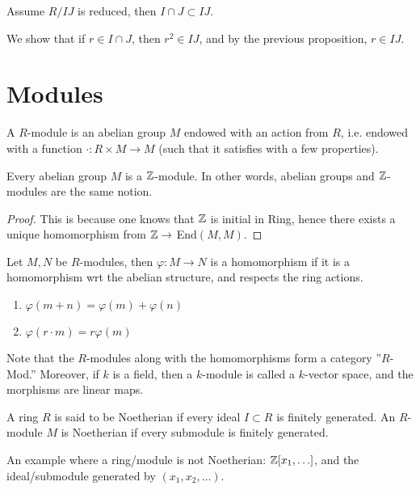 \begin{example}
    Assume $R/IJ$ is reduced, then $I\cap J\subset IJ$. 

    We show that if $r\in I\cap J$, then $r^2\in IJ$, and by the previous proposition, $r\in IJ$.
\end{example}

\section{Modules}
\begin{defn}[$R$-module]
    A $R$-module is an abelian group $M$ endowed with an action from $R$, i.e. endowed with a function $\cdot: R\times M\to M$ (such that it satisfies with a few properties).
\end{defn}
\begin{prop}
    Every abelian group $M$ is a $\mathbb{Z}$-module. In other words, abelian groups and $\mathbb{Z}$-modules are the same notion.
\end{prop}
\begin{proof}
    This is because one knows that $\mathbb{Z}$ is initial in Ring, hence there exists a unique homomorphism from $\mathbb{Z}\to$ End$(M,M)$.
\end{proof}
\begin{defn}
    Let $M,N$ be $R$-modules, then $\varphi:M\to N$ is a homomorphism if it is a homomorphism wrt the abelian structure, and respects the ring actions.
    \begin{enumerate}
        \item $\varphi(m+n)=\varphi(m)+\varphi(n)$
        \item $\varphi(r\cdot m)=r\varphi(m)$
    \end{enumerate}
\end{defn}
Note that the $R$-modules along with the homomorphisms form a category ''$R$-Mod.'' Moreover, if $k$ is a field, then a $k$-module is called a $k$-vector space, and the morphisms are linear maps.

\begin{defn}[Noetherian]
    A ring $R$ is said to be Noetherian if every ideal $I\subset R$ is finitely generated. An $R$-module $M$ is Noetherian if every submodule is finitely generated. 

    An example where a ring/module is not Noetherian: $\mathbb{Z}[x_1, \ldots]$, and the ideal/submodule generated by $(x_1, x_2, \ldots)$.
\end{defn}

